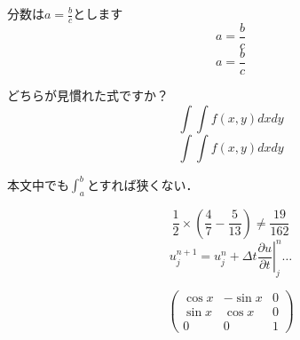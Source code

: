 \documentclass[lualatex]{jlreq}
\begin{document}
	分数は$a=\frac{b}{c}$とします
	\[
		a = \frac{b}{c}
	\]
	\begin{equation}
		a = \frac{b}{c}
	\end{equation}

	どちらが見慣れた式ですか？
	\[ \int\int f(x,y) dx dy \]
	\[ \int\!\!\!\int f(x,y) dx dy \]

	本文中でも$\displaystyle\int_{a}^{b}$とすれば狭くない．

	\[
		\frac{1}{2}\times
		\left(
			\frac{4}{7}-\frac{5}{13}
		\right)
		\neq\frac{19}{162}
	\]
	\[
		u_{j}^{n+1} = u_{j}^{n} + \Delta t
		\left.
			\frac{\partial u}{\partial t}
		\right|
		_{j}^{n}\dots
	\]

	\[
		\left(
		\begin{array}{ccc}
			\cos x & -\sin x & 0 \\
			\sin x & \cos x & 0 \\
			0 & 0 & 1
		\end{array}
		\right)
	\]
\end{document}
